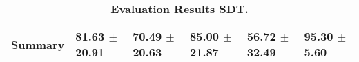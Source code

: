 \begin{table}[htb]
{\begin{tabular}{llllll}
\midrule
\textbf{Summary                                  } &                  \phantom{0}81.63 $\pm$ 20.91 &                      \phantom{0}70.49 $\pm$ 20.63 &                  \phantom{0}85.00 $\pm$ 21.87 &                  \phantom{0}56.72 $\pm$ 32.49 &  \phantom{0}95.30 $\pm$ \phantom{0}5.60 \\
\bottomrule
\end{tabular}%
}
\caption{\textbf{Evaluation Results SDT.}}
\label{tab:eval-results}
\end{table}
\newpage 
